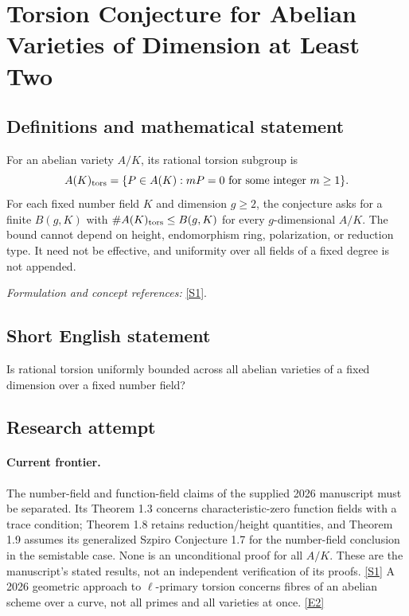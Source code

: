 \documentclass[11pt,a4paper]{article}
\newcommand{\sref}[2]{\hyperlink{source:#1:#2}{[S#2]}}
\newcommand{\eref}[2]{\hyperlink{extra:#1:#2}{[E#2]}}
\newif\ifshowcatalogue
\newcommand{\cataloguescope}[1]{\ifshowcatalogue
 \paragraph{Exact scope in the supplied catalogue.}
 \begin{quote}\small #1\end{quote}\fi}
\numberwithin{equation}{section}
\begin{document}
\setcounter{section}{0}
\clearpage
\section*{\texorpdfstring{Torsion Conjecture for Abelian Varieties of Dimension at Least Two}{Torsion Conjecture for Abelian Varieties of Dimension at Least Two}}\label{statement}
\subsection{Definitions and mathematical statement}
For an abelian variety $A/K$, its rational torsion subgroup is
\[
 A(K)_{\rm tors}=\{P\in A(K):mP=0\text{ for some integer }m\ge1\}.
\]
For each fixed number field $K$ and dimension $g\ge2$, the conjecture asks for a finite $B(g,K)$ with $\#A(K)_{\rm tors}\le B(g,K)$ for every $g$-dimensional $A/K$. The bound cannot depend on height, endomorphism ring, polarization, or reduction type. It need not be effective, and uniformity over all fields of a fixed degree is not appended.
\par\smallskip\textit{Formulation and concept references:} \sref{statement}{1}.
\cataloguescope{For every integer g>=2 and every number field K, there exists a finite constant B(g,K) such that every abelian variety A defined over K of dimension g satisfies \#A(K)\_tors <= B(g,K). Here A(K)\_tors is the subgroup of K-rational torsion points. The bound is uniform over all such A, without dependence on A, its height, endomorphisms, polarization degree or reduction type; it may depend on g and K. No effective formula, explicit numerical value or classification of torsion groups is required.}
\subsection{Short English statement}
Is rational torsion uniformly bounded across all abelian varieties of a fixed dimension over a fixed number field?
\subsection{Research attempt}

\paragraph{Current frontier.}
The number-field and function-field claims of the supplied 2026 manuscript
must be separated. Its Theorem 1.3 concerns characteristic-zero function
fields with a trace condition; Theorem 1.8 retains reduction/height quantities,
and Theorem 1.9 assumes its generalized Szpiro Conjecture 1.7 for the
number-field conclusion in the semistable case. None is an unconditional
proof for all $A/K$. These are the manuscript's stated results, not an
independent verification of its proofs. \sref{statement}{1}
A 2026 geometric approach to $\ell$-primary torsion concerns fibres of an
abelian scheme over a curve, not all primes and all varieties at once.
\eref{statement}{2}
\end{document}

